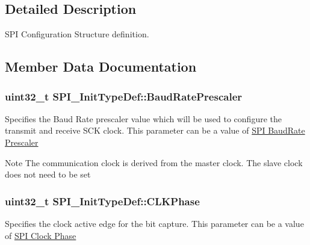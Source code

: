 \subsection{Detailed Description}
S\+PI Configuration Structure definition. 

\subsection{Member Data Documentation}
\subsubsection[{\texorpdfstring{Baud\+Rate\+Prescaler}{BaudRatePrescaler}}]{\setlength{\rightskip}{0pt plus 5cm}uint32\+\_\+t S\+P\+I\+\_\+\+Init\+Type\+Def\+::\+Baud\+Rate\+Prescaler}\hypertarget{struct_s_p_i___init_type_def_a1d553f90738cb633a9298d2b4d306fde}{}\label{struct_s_p_i___init_type_def_a1d553f90738cb633a9298d2b4d306fde}
Specifies the Baud Rate prescaler value which will be used to configure the transmit and receive S\+CK clock. This parameter can be a value of \hyperlink{group___s_p_i___baud_rate___prescaler}{S\+PI Baud\+Rate Prescaler} \begin{DoxyNote}{Note}
The communication clock is derived from the master clock. The slave clock does not need to be set 
\end{DoxyNote}
\subsubsection[{\texorpdfstring{C\+L\+K\+Phase}{CLKPhase}}]{\setlength{\rightskip}{0pt plus 5cm}uint32\+\_\+t S\+P\+I\+\_\+\+Init\+Type\+Def\+::\+C\+L\+K\+Phase}\hypertarget{struct_s_p_i___init_type_def_ab21a458209f2588f49a2353c56f62625}{}\label{struct_s_p_i___init_type_def_ab21a458209f2588f49a2353c56f62625}
Specifies the clock active edge for the bit capture. This parameter can be a value of \hyperlink{group___s_p_i___clock___phase}{S\+PI Clock Phase} 
